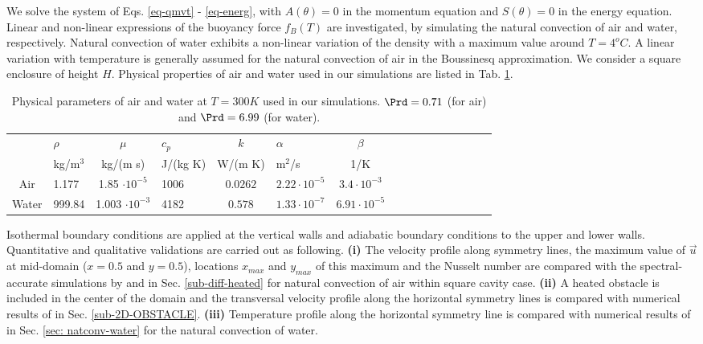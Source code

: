 We solve the system of Eqs. \eqref{eq-qmvt} - \eqref{eq-energ}, with $A(\theta) = 0$ in the momentum equation and $S(\theta) = 0$ in the energy equation.
Linear and non-linear expressions of the buoyancy force $f_B(T)$ are investigated, by simulating the natural convection of air and water, respectively.
Natural convection of water exhibits a non-linear variation of the density with a maximum value around $T=4^o C$. 
A linear variation with temperature is generally assumed for the natural convection of air in the Boussinesq approximation.
We consider a square enclosure of height $H$. 
Physical properties of air and water used in our simulations are listed in Tab. \ref{tab-param-phys-air}.
\begin{table}[!ht]
   \begin{center}
      \begin{tabular}{*{8}{cl}}
         
        & $\rho$ &$ \mu$ & $c_p $ & $k$ & $\alpha $ & $\beta$ \\
        & kg/m$^3$& kg/(m s) & J/(kg K) & W/(m K) & m$^2$/s & 1/K \\
         \hline
        Air & 1.177 & 1.85 $\cdot 10^{-5}$  & 1006 & $0.0262$ & $2.22 \cdot 10^{-5}$ & $3.4 \cdot 10^{-3}$ \\
        Water & 999.84 & 1.003 $\cdot 10^{-3}$  & 4182 & $0.578$ & $1.33 \cdot 10^{-7}$ & $6.91 \cdot 10^{-5}$
      \end{tabular}
   \end{center}
   \caption{Physical parameters of air and water at $T = 300K$ used in our simulations. $\Prd = 0.71$ (for air) and $\Prd = 6.99$ (for water).}
   \label{tab-param-phys-air}
\end{table}

\noindent Isothermal boundary conditions are applied at the vertical walls and adiabatic boundary conditions to the upper and lower walls.
Quantitative and qualitative validations are carried out as following.
\textbf{(i)} The velocity profile along symmetry lines, the maximum value of $\vec u$ at mid-domain ($x=0.5$ and $y=0.5$), locations $x_{max}$ and $y_{max}$ of this maximum and the Nusselt number are compared with the spectral-accurate simulations by \cite{LeQuere91} and  \cite{de1983natural} in Sec. \ref{sub-diff-heated} for natural convection of air within square cavity case.
\textbf{(ii)} A heated obstacle is included in the center of the domain and the transversal velocity profile along the  horizontal symmetry lines is compared with numerical results of \cite{Raluca2013} 
in Sec. \ref{sub-2D-OBSTACLE}.
\textbf{(iii)} Temperature profile along the horizontal symmetry line is compared with numerical results of \cite{Kowalewski-2003} in Sec. \ref{sec: natconv-water} for the natural convection of water.


